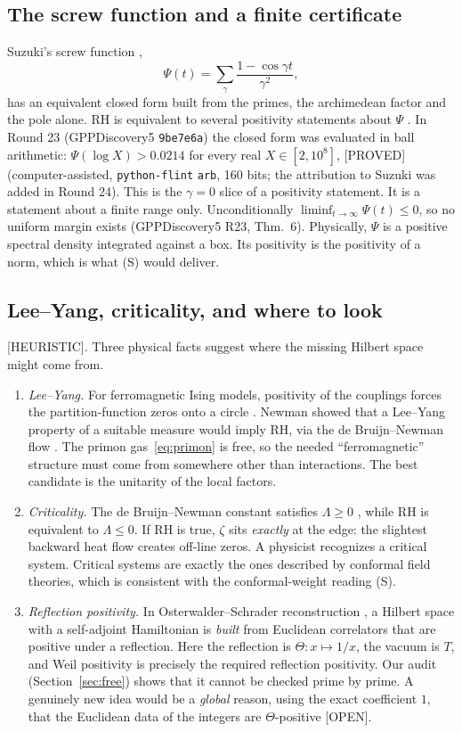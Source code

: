 \documentclass[11pt,a4paper]{article}
\theoremstyle{plain}
\theoremstyle{definition}
\theoremstyle{remark}
\newcommand{\lab}[1]{\textsf{\small[#1]}}
\newcommand{\PROVED}{\lab{PROVED}}
\newcommand{\HEUR}{\lab{HEURISTIC}}
\newcommand{\OPEN}{\lab{OPEN}}
\begin{document}
\subsection{The screw function and a finite certificate}

Suzuki's screw function \cite{Suzuki2022},
\[
\Psi(t)=\sum_\gamma\frac{1-\cos\gamma t}{\gamma^2},
\]
has an equivalent closed form built from the primes, the archimedean factor
and the pole alone. RH is equivalent to several positivity statements about
$\Psi$ \cite{Suzuki2022}. In Round 23 (GPPDiscovery5 \texttt{9be7e6a}) the
closed form was evaluated in ball arithmetic: $\Psi(\log X)>0.0214$ for every
real $X\in[2,10^8]$, \PROVED{} (computer-assisted, \texttt{python-flint}
\texttt{arb}, 160 bits; the attribution to Suzuki was added in Round 24).
This is the $\gamma=0$ slice of a positivity statement. It is a statement
about a finite range only. Unconditionally
$\liminf_{t\to\infty}\Psi(t)\le0$, so no uniform margin exists
(GPPDiscovery5 R23, Thm.~6). Physically, $\Psi$ is a positive spectral
density integrated against a box. Its positivity is the positivity of a
norm, which is what (S) would deliver.

\subsection{Lee--Yang, criticality, and where to look}

\HEUR. Three physical facts suggest where the missing Hilbert space might
come from.
\begin{enumerate}[label=(\roman*)]
\item \emph{Lee--Yang.} For ferromagnetic Ising models, positivity of the
couplings forces the partition-function zeros onto a circle
\cite{LeeYang1952}. Newman showed that a Lee--Yang property of a suitable
measure would imply RH, via the de Bruijn--Newman flow \cite{Newman1976}.
The primon gas~\eqref{eq:primon} is free, so the needed ``ferromagnetic''
structure must come from somewhere other than interactions. The best
candidate is the unitarity of the local factors.
\item \emph{Criticality.} The de Bruijn--Newman constant satisfies
$\Lambda\ge0$ \cite{RodgersTao2020}, while RH is equivalent to
$\Lambda\le 0$. If RH is true, $\zeta$ sits \emph{exactly} at the edge:
the slightest backward heat flow creates off-line zeros. A physicist
recognizes a critical system. Critical systems are exactly the ones
described by conformal field theories, which is consistent with the
conformal-weight reading (S).
\item \emph{Reflection positivity.} In Osterwalder--Schrader
reconstruction \cite{OsterwalderSchrader1973}, a Hilbert space with a
self-adjoint Hamiltonian is \emph{built} from Euclidean correlators that are
positive under a reflection. Here the reflection is
$\Theta:x\mapsto1/x$, the vacuum is $T$, and Weil positivity is precisely
the required reflection positivity. Our audit (Section~\ref{sec:free}) shows
that it cannot be checked prime by prime. A genuinely new idea would be a
\emph{global} reason, using the exact coefficient $1$, that the Euclidean
data of the integers are $\Theta$-positive \OPEN.
\end{enumerate}
\end{document}
